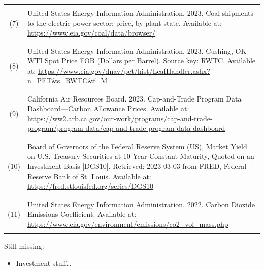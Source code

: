 \begin{center}
\begin{longtable}{c L{0.8\textwidth}}
        \hline \\[-3ex]
        (7) & United States Energy Information Administration. 2023. Coal shipments to the electric power sector: price, by plant state. Available at: \url{https://www.eia.gov/coal/data/browser/} \\ \\[-3ex]
        \hline \\[-3ex]
        (8) & United States Energy Information Administration. 2023. Cushing, OK WTI Spot Price FOB (Dollars per Barrel). Source key: RWTC. Available at: \url{https://www.eia.gov/dnav/pet/hist/LeafHandler.ashx?n=PET&s=RWTC&f=M} \\ \\[-3ex]
        \hline \\[-3ex]
        (9) & California Air Resources Board. 2023. Cap-and-Trade Program Data Dashboard---Carbon Allowance Prices. Available at: \url{https://ww2.arb.ca.gov/our-work/programs/cap-and-trade-program/program-data/cap-and-trade-program-data-dashboard} \\ \\[-3ex]
        \hline \\[-3ex]
        (10) & Board of Governors of the Federal Reserve System (US), Market Yield on U.S. Treasury Securities at 10-Year Constant Maturity, Quoted on an Investment Basis [DGS10]. Retrieved: 2023-03-03 from FRED, Federal Reserve Bank of St. Louis. Available at: \url{https://fred.stlouisfed.org/series/DGS10} \\ \\[-3ex]
        \hline \\[-3ex]
        (11) & United States Energy Information Administration. 2022. Carbon Dioxide Emissions Coefficient. Available at: \url{https://www.eia.gov/environment/emissions/co2_vol_mass.php}\\ \\[-3ex]
        \hline\hline
    \end{longtable}
\end{center}

Still missing:
\begin{itemize}
    \item Investment stuff\ldots
\end{itemize}
